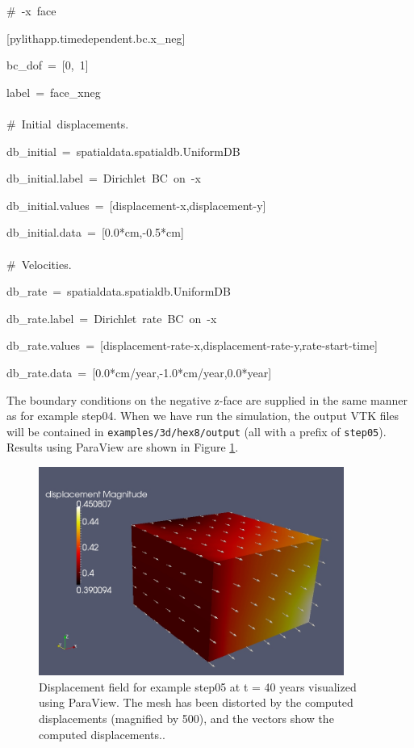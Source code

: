 \begin{lyxcode}
\#~-x~face

{[}pylithapp.timedependent.bc.x\_neg{]}

bc\_dof~=~{[}0,~1{]}

label~=~face\_xneg~\\
~\\


\#~Initial~displacements.

db\_initial~=~spatialdata.spatialdb.UniformDB

db\_initial.label~=~Dirichlet~BC~on~-x

db\_initial.values~=~{[}displacement-x,displacement-y{]}

db\_initial.data~=~{[}0.0{*}cm,-0.5{*}cm{]}~\\
~\\


\#~Velocities.

db\_rate~=~spatialdata.spatialdb.UniformDB

db\_rate.label~=~Dirichlet~rate~BC~on~-x

db\_rate.values~=~{[}displacement-rate-x,displacement-rate-y,rate-start-time{]}

db\_rate.data~=~{[}0.0{*}cm/year,-1.0{*}cm/year,0.0{*}year{]}
\end{lyxcode}
The boundary conditions on the negative z-face are supplied in the
same manner as for example step04. When we have run the simulation,
the output VTK files will be contained in \texttt{examples/3d/hex8/output}
(all with a prefix of \texttt{step05}). Results using ParaView are
shown in Figure \ref{fig:step05-displ-t40}.
\begin{figure}
\centering{}\includegraphics[width=10cm]{tutorials/3dhex8/figs/step05-displ-t40}\caption{Displacement field for example step05 at t = 40 years visualized using
ParaView. The mesh has been distorted by the computed displacements
(magnified by 500), and the vectors show the computed displacements.\label{fig:step05-displ-t40}.}
\end{figure}



